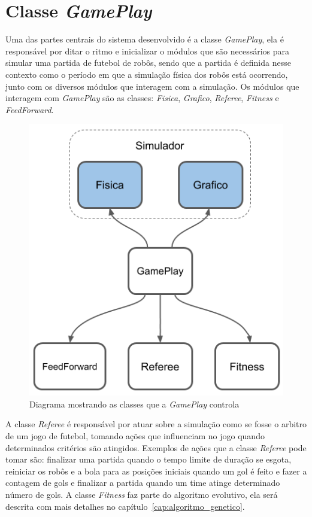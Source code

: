 \section{Classe \textit{GamePlay}}

Uma das partes centrais do sistema desenvolvido é a classe \textit{GamePlay}, ela é responsável por ditar o ritmo e inicializar o módulos que são necessários para simular uma partida de futebol de robôs, sendo que a partida é definida nesse contexto como o período em que a simulação física dos robôs está ocorrendo, junto com os diversos módulos que interagem com a simulação. Os módulos que interagem com \textit{GamePlay} são as classes: \textit{Fisica}, \textit{Grafico}, \textit{Referee}, \textit{Fitness} e \textit{FeedForward}.

\begin{figure}[!htb]
    \caption{\label{img:gameplay_modulos}Diagrama mostrando as classes que a \textit{GamePlay} controla}
	\begin{center}
        \includegraphics[scale=0.75]{img/blocos_gameplay.png}
	\end{center}
\end{figure}

A classe \textit{Referee} é responsável por atuar sobre a simulação como se fosse o arbitro de um jogo de futebol, tomando ações que influenciam no jogo quando determinados critérios são atingidos. Exemplos de ações que a classe \textit{Referee} pode tomar são: finalizar uma partida quando o tempo limite de duração se esgota, reiniciar os robôs e a bola para as posições iniciais quando um gol é feito e fazer a contagem de gols e finalizar a partida quando um time atinge determinado número de gols. A classe \textit{Fitness} faz parte do algoritmo evolutivo, ela será descrita com mais detalhes no capítulo~\ref{cap:algoritmo_genetico}.

